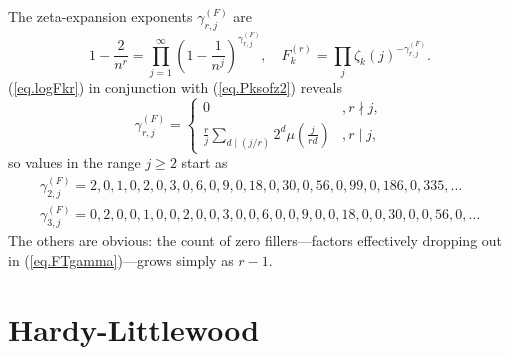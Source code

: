 \documentclass{amsart}
\begin{document}
The zeta-expansion exponents $\gamma_{r,j}^{(F)}$ are
\begin{equation}
1-\frac{2}{n^r} = \prod_{j=1}^\infty \left(1-\frac{1}{n^j}\right)^{\gamma_{r,j}^{(F)}}
,
\quad
F_k^{(r)}
=
\prod_j \zeta_k(j)^{-\gamma_{r,j}^{(F)}}
\label{eq.FTgamma}
.
\end{equation}
(\ref{eq.logFkr}) in conjunction with (\ref{eq.Pksofz2}) reveals
\begin{equation}
\gamma_{r,j}^{(F)}=\left\{
\begin{array}{ll}
0 & , r \nmid j, \\
\displaystyle\frac{r}{j}\sum_{d\mid (j/r)} 2^d\mu(\frac{j}{rd})  & ,  r \mid j,
\end{array}
\right.
\end{equation}
so values in the range $j\ge 2$ start as
\begin{eqnarray}
\gamma_{2,j}^{(F)} = 2, 0, 1, 0, 2, 0, 3, 0, 6, 0, 9, 0, 18, 0, 30, 0, 56, 0, 99, 0, 186, 0, 335,
\ldots
\\
\gamma_{3,j}^{(F)} = 0, 2, 0, 0, 1, 0, 0, 2, 0, 0, 3, 0, 0, 6, 0, 0, 9, 0, 0, 18, 0, 0, 30, 0, 0, 56, 0,
\ldots
\end{eqnarray}
The others are obvious: the count of zero fillers---factors effectively
dropping out in (\ref{eq.FTgamma})---grows
simply as $r-1$.

\section{Hardy-Littlewood}
\end{document}
